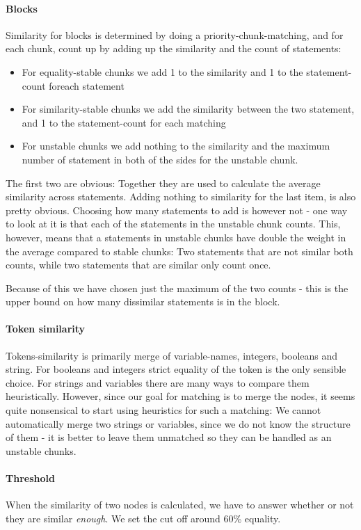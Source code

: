 \documentclass[11pt]{article}
\begin{document}
\paragraph{Blocks} Similarity for blocks is determined by doing a priority-chunk-matching, and for each chunk, count up by adding up the similarity and the count of statements:

\begin{itemize}
	\item For equality-stable chunks we add 1 to the similarity and 1 to the statement-count foreach statement
	\item For similarity-stable chunks we add the similarity between the two statement, and 1 to the statement-count for each matching
	\item For unstable chunks we add nothing to the similarity and the maximum number of statement in both of the sides for the unstable chunk.
\end{itemize}

The first two are obvious: Together they are used to calculate the average similarity across statements. Adding nothing to similarity for the last item, is also pretty obvious. Choosing how many statements to add is however not - one way to look at it is that each of the statements in the unstable chunk counts. This, however, means that a statements in unstable chunks have double the weight in the average compared to stable chunks: Two statements that are not similar both counts, while two statements that are similar only count once.

Because of this we have chosen just the maximum of the two counts - this is the upper bound on how many dissimilar statements is in the block.

\paragraph{Token similarity} Tokens-similarity is primarily merge of variable-names, integers, booleans and string. For booleans and integers strict equality of the token is the only sensible choice. For strings and variables there are many ways to compare them heuristically. However, since our goal for matching is to merge the nodes, it seems quite nonsensical to start using heuristics for such a matching: We cannot automatically merge two strings or variables, since we do not know the structure of them - it is better to leave them unmatched so they can be handled as an unstable chunks.

\paragraph{Threshold} When the similarity of two nodes is calculated, we have to answer whether or not they are similar \textit{enough}. We set the cut off around 60\% equality.
\end{document}

